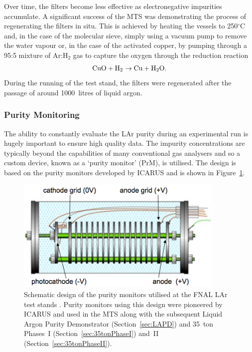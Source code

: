 Over time, the filters become less effective as electronegative impurities accumulate.  A significant success of the MTS was demonstrating the process of regenerating the filters in situ.  This is achieved by heating the vessels to 250$^{\circ}$C and, in the case of the molecular sieve, simply using a vacuum pump to remove the water vapour or, in the case of the activated copper, by pumping through a 95:5 mixture of Ar:H$_2$ gas to capture the oxygen through the reduction reaction
\begin{equation}
  \textnormal{CuO} + \textnormal{H}_2 \rightarrow \textnormal{Cu} + \textnormal{H}_2\textnormal{O}.
\end{equation}
During the running of the test stand, the filters were regenerated after the passage of around 1000~litres of liquid argon.

\subsubsection{Purity Monitoring}\label{sec:PurityMonitoring}

The ability to constantly evaluate the LAr purity during an experimental run is hugely important to ensure high quality data.  The impurity concentrations are typically beyond the capabilities of many conventional gas analysers and so a custom device, known as a `purity monitor' (PrM), is utilised.  The design is based on the purity monitors developed by ICARUS \cite{ICARUSPurityMonitor} and is shown in Figure~\ref{fig:PurityMonitor}.

\begin{figure}
  \centering
  \includegraphics[width=10cm]{PurityMonitor.png}
  \caption[Schematic design of the purity monitors utilised at the FNAL LAr test stands.]{Schematic design of the purity monitors utilised at the FNAL LAr test stands \cite{35tonPhaseI2014}.  Purity monitors using this design were pioneered by ICARUS \cite{ICARUSPurityMonitor} and used in the MTS along with the subsequent Liquid Argon Purity Demonstrator (Section~\ref{sec:LAPD}) and 35~ton Phases~I (Section~\ref{sec:35tonPhaseI}) and~II (Section~\ref{sec:35tonPhaseII}).}
  \label{fig:PurityMonitor}
\end{figure}

